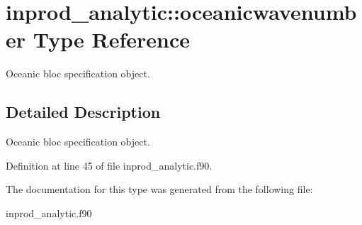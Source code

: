\hypertarget{structinprod__analytic_1_1oceanicwavenumber}{}\section{inprod\+\_\+analytic\+:\+:oceanicwavenumber Type Reference}
\label{structinprod__analytic_1_1oceanicwavenumber}


Oceanic bloc specification object.  




\subsection{Detailed Description}
Oceanic bloc specification object. 

Definition at line 45 of file inprod\+\_\+analytic.\+f90.



The documentation for this type was generated from the following file\+:\begin{DoxyCompactItemize}
\item 
inprod\+\_\+analytic.\+f90\end{DoxyCompactItemize}
